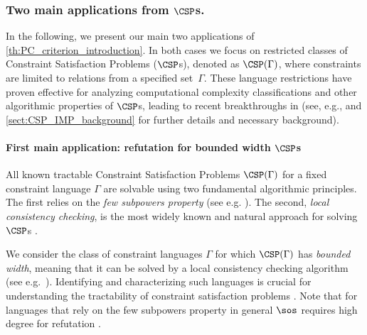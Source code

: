 \documentclass[11pt]{article}
\begin{document}
\subsubsection*{Two main applications from $\CSP$s.}
In the following, we present our main two applications of \cref{th:PC_criterion_introduction}.
In both cases we focus on restricted classes of Constraint Satisfaction Problems (\(\CSP\)s), denoted as \(\CSP(\Gamma)\), where constraints are limited to relations from a specified set~\(\Gamma\). These language restrictions have proven effective for analyzing computational complexity classifications and other algorithmic properties of $\CSP$s, leading to recent breakthroughs in \cite{Bulatov17,Zhuk17,Zhuk20} (see, e.g., \cite{barto_et_al:DFU:2017:6959,2017dfu7,Chen09} and \cref{sect:CSP_IMP_background} for further details and necessary background).

\paragraph{First main application: refutation for bounded width $\CSP$s}
%
All known tractable Constraint Satisfaction Problems $\CSP(\Gamma)$ for a fixed constraint language $\Gamma$  are solvable using two fundamental algorithmic principles. The first relies on the \emph{few subpowers property} (see e.g. \cite{barto_et_al:DFU:2017:6959}). The second, \emph{local consistency checking}, is the most widely known and natural approach for solving $\CSP$s \cite{BartoK14,barto_et_al:DFU:2017:6959,Bulatov17}.


We consider the class of constraint languages $\Gamma$ for which $\CSP(\Gamma)$ has \emph{bounded width}, meaning that it can be solved by a local consistency checking algorithm (see e.g.~\cite{BartoK14,barto_et_al:DFU:2017:6959}). Identifying and characterizing such languages is crucial for understanding the tractability of constraint satisfaction problems \cite{BartoK14,barto_et_al:DFU:2017:6959}. Note that for languages that rely on the {few subpowers property} in general $\sos$ requires high degree for refutation \cite{barto_et_al:DFU:2017:6959,BartoK14, GRIGORIEV2001613}.
\end{document}
